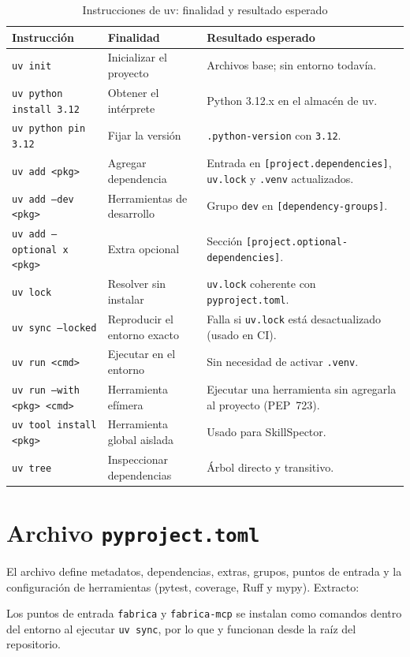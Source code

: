 \begin{table}[H]\centering\small
\caption{Instrucciones de uv: finalidad y resultado esperado}\label{tab:uv}
\begin{tabularx}{\linewidth}{@{}l X X@{}}\toprule
Instrucción & Finalidad & Resultado esperado\\\midrule
\texttt{uv init} & Inicializar el proyecto & Archivos base; sin entorno todavía.\\
\texttt{uv python install 3.12} & Obtener el intérprete & Python 3.12.x en el almacén de uv.\\
\texttt{uv python pin 3.12} & Fijar la versión & \texttt{.python-version} con \texttt{3.12}.\\
\texttt{uv add <pkg>} & Agregar dependencia & Entrada en \texttt{[project.dependencies]}, \texttt{uv.lock} y \texttt{.venv} actualizados.\\
\texttt{uv add --dev <pkg>} & Herramientas de desarrollo & Grupo \texttt{dev} en \texttt{[dependency-groups]}.\\
\texttt{uv add --optional x <pkg>} & Extra opcional & Sección \texttt{[project.optional-dependencies]}.\\
\texttt{uv lock} & Resolver sin instalar & \texttt{uv.lock} coherente con \texttt{pyproject.toml}.\\
\texttt{uv sync --locked} & Reproducir el entorno exacto & Falla si \texttt{uv.lock} está desactualizado (usado en CI).\\
\texttt{uv run <cmd>} & Ejecutar en el entorno & Sin necesidad de activar \texttt{.venv}.\\
\texttt{uv run --with <pkg> <cmd>} & Herramienta efímera & Ejecutar una herramienta sin agregarla al proyecto (PEP~723).\\
\texttt{uv tool install <pkg>} & Herramienta global aislada & Usado para SkillSpector.\\
\texttt{uv tree} & Inspeccionar dependencias & Árbol directo y transitivo.\\\bottomrule
\end{tabularx}
\end{table}

\section{Archivo \texttt{pyproject.toml}}
El archivo define metadatos, dependencias, extras, grupos, puntos de entrada y la configuración de
herramientas (pytest, coverage, Ruff y mypy). Extracto:

Los puntos de entrada \texttt{fabrica} y \texttt{fabrica-mcp} se instalan como comandos dentro del entorno al
ejecutar \texttt{uv sync}, por lo que  y  funcionan desde la
raíz del repositorio.


